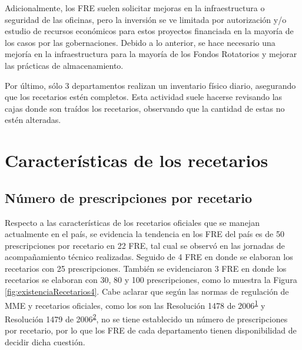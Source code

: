 \documentclass[
]{book}
\begin{document}
Adicionalmente, los FRE suelen solicitar mejoras en la infraestructura o seguridad de las oficinas, pero la inversión se ve limitada por autorización y/o estudio de recursos económicos para estos proyectos financiada en la mayoría de los casos por las gobernaciones. Debido a lo anterior, se hace necesario una mejoría en la infraestructura para la mayoría de los Fondos Rotatorios y mejorar las prácticas de almacenamiento.

Por último, sólo 3 departamentos realizan un inventario físico diario, asegurando que los recetarios estén completos. Esta actividad suele hacerse revisando las cajas donde son traídos los recetarios, observando que la cantidad de estas no estén alteradas.

\hypertarget{caracteruxedsticas-de-los-recetarios}{%
\section{Características de los recetarios}\label{caracteruxedsticas-de-los-recetarios}}


\hypertarget{nuxfamero-de-prescripciones-por-recetario}{%
\subsection{Número de prescripciones por recetario}\label{nuxfamero-de-prescripciones-por-recetario}}

Respecto a las características de los recetarios oficiales que se manejan actualmente en el país, se evidencia la tendencia en los FRE del país es de 50 prescripciones por recetario en 22 FRE, tal cual se observó en las jornadas de acompañamiento técnico realizadas. Seguido de 4 FRE en donde se elaboran los recetarios con 25 prescripciones. También se evidenciaron 3 FRE en donde los recetarios se elaboran con 30, 80 y 100 prescripciones, como lo muestra la Figura \ref{fig:existenciaRecetarios4}. Cabe aclarar que según las normas de regulación de MME y recetarios oficiales, como los son las Resolución 1478 de 2006\textsuperscript{\protect\hyperlink{ref-MSPS1478-2006}{1}} y Resolución 1479 de 2006\textsuperscript{\protect\hyperlink{ref-MSPS1479-2006}{2}}, no se tiene establecido un número de prescripciones por recetario, por lo que los FRE de cada departamento tienen disponibilidad de decidir dicha cuestión.
\end{document}
